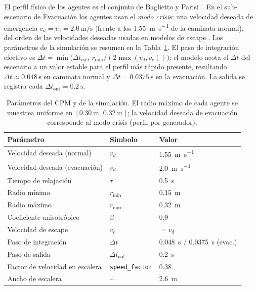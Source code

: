 \documentclass[11pt,a4paper]{article}
\begin{document}
El perfil físico de los agentes es el conjunto de Baglietto y Parisi~\cite{baglietto2011}. En el
sub-escenario de Evacuación los agentes usan el \emph{modo crisis}: una velocidad deseada de
emergencia $v_d = v_e = \SI{2.0}{\metre\per\second}$ (frente a los \SI{1.55}{\metre\per\second}
de la caminata normal), del orden de las velocidades deseadas usadas en modelos de escape
\cite{helbing2000}. Los parámetros de la simulación se resumen en la Tabla~\ref{tab:params}. El
paso de integración efectivo es
$\Delta t = \min\!\bigl(\Delta t_{\text{esc}},\, r_{\min}/(2\max(v_d,v_e))\bigr)$: el modelo
acota el $\Delta t$ del escenario a un valor estable para el perfil más rápido presente,
resultando $\Delta t \approx \SI{0.048}{\second}$ en caminata normal y
$\Delta t = \SI{0.0375}{\second}$ en la evacuación. La salida se registra cada
$\Delta t_{\text{out}}=\SI{0.2}{\second}$.

\begin{table}[H]
\centering
\small
\begin{tabular}{@{}lll@{}}
\toprule
\textbf{Parámetro} & \textbf{Símbolo} & \textbf{Valor} \\
\midrule
Velocidad deseada (normal)       & $v_d$   & \SI{1.55}{\metre\per\second} \\
Velocidad deseada (evacuación)   & $v_d$   & \SI{2.0}{\metre\per\second} \\
Tiempo de relajación     & $\tau$       & \SI{0.5}{\second} \\
Radio mínimo             & $r_{\min}$   & \SI{0.15}{\metre} \\
Radio máximo             & $r_{\max}$   & \SI{0.32}{\metre} \\
Coeficiente anisotrópico & $\beta$      & $0.9$ \\
Velocidad de escape      & $v_e$        & $= v_d$ \\
Paso de integración      & $\Delta t$   & \SI{0.048}{\second} / \SI{0.0375}{\second} (evac.) \\
Paso de salida           & $\Delta t_{\text{out}}$ & \SI{0.2}{\second} \\
Factor de velocidad en escalera & \texttt{speed\_factor} & $0.38$ \\
Ancho de escalera        & --           & \SI{2.6}{\metre} \\
\bottomrule
\end{tabular}
\caption{Parámetros del CPM y de la simulación. El radio máximo de cada agente se muestrea
uniforme en $[\SI{0.30}{\metre},\, \SI{0.32}{\metre}]$; la velocidad deseada de evacuación
corresponde al modo crisis (perfil por generador).}
\label{tab:params}
\end{table}
\end{document}
